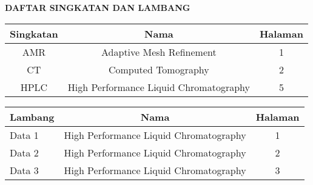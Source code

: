 \begin{center}
    \textbf{\large DAFTAR SINGKATAN DAN LAMBANG}
\end{center}
    
\vspace{0.5cm}

\begin{table}[!ht]
    \centering
        \begin{tabular}{|c|c|c|}
            \hline
            Singkatan   & Nama & Halaman \\
            \hline
            AMR & \raggedright Adaptive Mesh Refinement & 1 \\
            \hline
            CT & \raggedright Computed Tomography & 2 \\
            \hline
            HPLC & \raggedright High Performance Liquid Chromatography & 5 \\
            \hline
        \end{tabular}
\end{table}

\begin{table}[!ht]
    \centering
        \begin{tabular}{|l|l|c|}
            \hline
            \multicolumn{1}{|c|}{Lambang} & \multicolumn{1}{c|}{Nama} & \multicolumn{1}{c|}{Halaman} \\
            \hline
            Data 1 & High Performance Liquid Chromatography & 1 \\
            \hline
            Data 2 & High Performance Liquid Chromatography  & 2 \\
            \hline
            Data 3 & High Performance Liquid Chromatography  & 3 \\
            \hline
        \end{tabular}
\end{table}



    
    
    
    